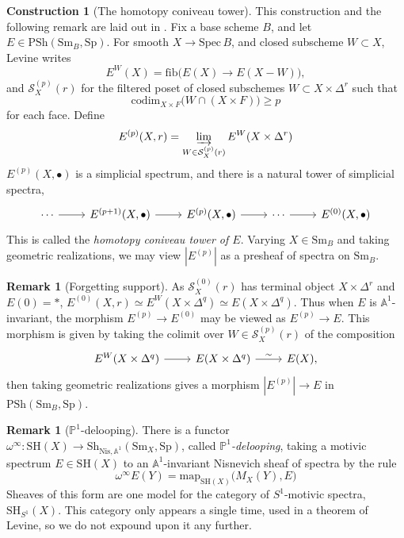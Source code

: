 \documentclass[11pt, twoside]{article}
\numberwithin{equation}{section}
\theoremstyle{definition}
\newtheorem{construction}[equation]{Construction}
\newtheorem{remark}[equation]{Remark}
\newcommand{\bb}[1]{\mathbb{#1}}
\newcommand{\colim}{\varinjlim}
\newcommand{\spec}{\mathrm{Spec} \,}
\newcommand{\codim}{\mathrm{codim}}
\newcommand{\map}{\mathrm{map}}
\newcommand{\sh}{\mathrm{SH}}
\newcommand{\Sp}{\mathrm{Sp}}
\newcommand{\psh}{\mathrm{PSh}}
\newcommand{\shv}{\mathrm{Sh}}
\newcommand{\nis}{\mathrm{Nis}}
\newcommand{\sm}{\mathrm{Sm}}
\begin{document}
\begin{construction}[The homotopy coniveau tower]
This construction and the following remark are laid out in \cite[\S 2]{LevHC}. Fix a base scheme \(B\), and let \(E \in \psh(\sm_B, \Sp)\). For smooth \(X \to \spec B\), and closed subscheme \(W \subset X\), Levine writes 
\[E^W(X) = \mathrm{fib}\big(E(X) \to E(X - W)\big),\]
and \(\mathcal{S}_X^{(p)}(r)\) for the filtered poset of closed subschemes \(W \subset X \times \Delta^r\) such that 
\[\codim_{X \times F} \big(W \cap (X \times F)\big) \geq p\]
for each face. Define 
\[E^{(p)}(X, r) = \colim_{W \in \mathcal{S}_X^{(p)}(r)} E^W(X \times \Delta^r)\]
\(E^{(p)}(X, \bullet)\) is a simplicial spectrum, and there is a natural tower of simplicial spectra, 
\[\begin{tikzcd} 
\cdots \ar[r] & E^{(p + 1)}(X, \bullet) \ar[r] & E^{(p)}(X, \bullet) \ar[r] & \cdots \ar[r] & E^{(0)}(X, \bullet)
\end{tikzcd}\]
This is called the \emph{homotopy coniveau tower of \(E\)}. Varying \(X \in \sm_B\) and taking geometric realizations, we may view \(|E^{(p)}|\) as a presheaf of spectra on \(\sm_B\).
\end{construction}

\begin{remark}[Forgetting support]\label{rem:supp-gone}
As \(\mathcal{S}_X^{(0)}(r)\) has terminal object \(X \times \Delta^r\) and \(E(0) = *\), \(E^{(0)}(X, r) \simeq E^W(X \times \Delta^q) \simeq E(X \times \Delta^q)\). Thus when \(E\) is \(\bb{A}^1\)-invariant, the morphism \(E^{(p)} \to E^{(0)}\) may be viewed as \(E^{(p)} \to E\). This morphism is given by taking the colimit over \(W \in \mathcal{S}_X^{(p)}(r)\) of the composition 
\[\begin{tikzcd}
E^W(X \times \Delta^q) \ar[r] & E(X \times \Delta^q) \ar[r, "\sim"] & E(X),
\end{tikzcd}\]
then taking geometric realizations gives a morphism \(|E^{(p)}| \to E\) in \(\psh(\sm_B, \Sp)\). 
\end{remark}

\begin{remark}[\(\bb{P}^1\)-delooping]
There is \cite[\S 3.2]{BEM} a functor \(\omega^\infty \colon \sh(X) \to \shv_{\nis, \bb{A}^1}(\sm_X, \Sp)\), called \emph{\(\bb{P}^1\)-delooping}, taking a motivic spectrum \(E \in \sh(X)\) to an \(\bb{A}^1\)-invariant Nisnevich sheaf of spectra by the rule 
\[\omega^\infty E(Y) = \map_{\sh(X)}\big(M_X(Y), E\big)\]
Sheaves of this form are one model for the category of \(S^1\)-motivic spectra, \(\sh_{S^1}(X)\). This category only appears a single time, used in a theorem of Levine, so we do not expound upon it any further.
\end{remark}
\end{document}
